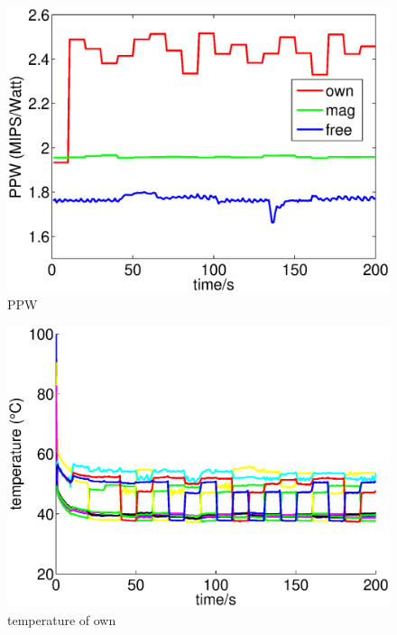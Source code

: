 \begin{figure}
\centering
\includegraphics[width=1\linewidth]{fig/PPW.eps}
\caption{PPW}
\end{figure}

\begin{figure}
\centering
\includegraphics[width=1\linewidth]{fig/tem_own.eps}
\caption{temperature of own}
\end{figure}

